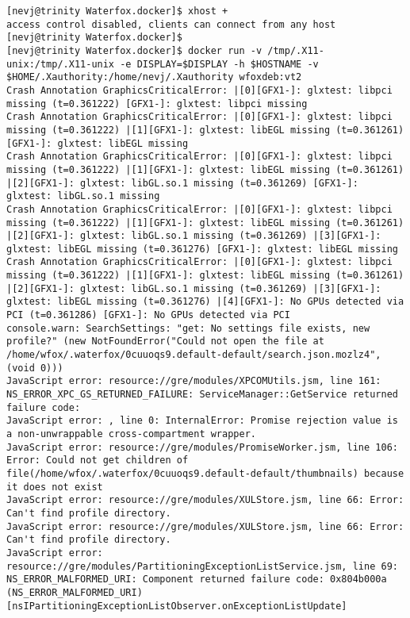 \documentclass[a4paper]{article}  %
\begin{document}
\begin{tcolorbox}[breakable]
\begin{verbatim}
[nevj@trinity Waterfox.docker]$ xhost +
access control disabled, clients can connect from any host
[nevj@trinity Waterfox.docker]$ 
[nevj@trinity Waterfox.docker]$ docker run -v /tmp/.X11-unix:/tmp/.X11-unix -e DISPLAY=$DISPLAY -h $HOSTNAME -v $HOME/.Xauthority:/home/nevj/.Xauthority wfoxdeb:vt2
Crash Annotation GraphicsCriticalError: |[0][GFX1-]: glxtest: libpci missing (t=0.361222) [GFX1-]: glxtest: libpci missing
Crash Annotation GraphicsCriticalError: |[0][GFX1-]: glxtest: libpci missing (t=0.361222) |[1][GFX1-]: glxtest: libEGL missing (t=0.361261) [GFX1-]: glxtest: libEGL missing
Crash Annotation GraphicsCriticalError: |[0][GFX1-]: glxtest: libpci missing (t=0.361222) |[1][GFX1-]: glxtest: libEGL missing (t=0.361261) |[2][GFX1-]: glxtest: libGL.so.1 missing (t=0.361269) [GFX1-]: glxtest: libGL.so.1 missing
Crash Annotation GraphicsCriticalError: |[0][GFX1-]: glxtest: libpci missing (t=0.361222) |[1][GFX1-]: glxtest: libEGL missing (t=0.361261) |[2][GFX1-]: glxtest: libGL.so.1 missing (t=0.361269) |[3][GFX1-]: glxtest: libEGL missing (t=0.361276) [GFX1-]: glxtest: libEGL missing
Crash Annotation GraphicsCriticalError: |[0][GFX1-]: glxtest: libpci missing (t=0.361222) |[1][GFX1-]: glxtest: libEGL missing (t=0.361261) |[2][GFX1-]: glxtest: libGL.so.1 missing (t=0.361269) |[3][GFX1-]: glxtest: libEGL missing (t=0.361276) |[4][GFX1-]: No GPUs detected via PCI (t=0.361286) [GFX1-]: No GPUs detected via PCI
console.warn: SearchSettings: "get: No settings file exists, new profile?" (new NotFoundError("Could not open the file at /home/wfox/.waterfox/0cuuoqs9.default-default/search.json.mozlz4", (void 0)))
JavaScript error: resource://gre/modules/XPCOMUtils.jsm, line 161: NS_ERROR_XPC_GS_RETURNED_FAILURE: ServiceManager::GetService returned failure code:
JavaScript error: , line 0: InternalError: Promise rejection value is a non-unwrappable cross-compartment wrapper.
JavaScript error: resource://gre/modules/PromiseWorker.jsm, line 106: Error: Could not get children of file(/home/wfox/.waterfox/0cuuoqs9.default-default/thumbnails) because it does not exist
JavaScript error: resource://gre/modules/XULStore.jsm, line 66: Error: Can't find profile directory.
JavaScript error: resource://gre/modules/XULStore.jsm, line 66: Error: Can't find profile directory.
JavaScript error: resource://gre/modules/PartitioningExceptionListService.jsm, line 69: NS_ERROR_MALFORMED_URI: Component returned failure code: 0x804b000a (NS_ERROR_MALFORMED_URI) [nsIPartitioningExceptionListObserver.onExceptionListUpdate]

\end{verbatim}
\end{tcolorbox}
\end{document}
